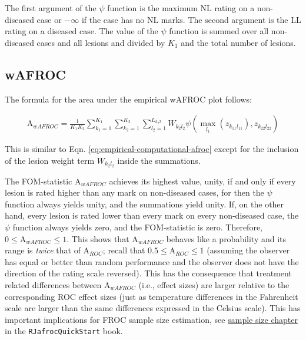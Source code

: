 \documentclass[
]{book}
\begin{document}
The first argument of the \(\psi\) function is the maximum NL rating on a non-diseased case or \(-\infty\) if the case has no NL marks. The second argument is the LL rating on a diseased case. The value of the \(\psi\) function is summed over all non-diseased cases and all lesions and divided by \(K_1\) and the total number of lesions.

\hypertarget{wafroc}{%
\subsection{wAFROC}\label{wafroc}}

The formula for the area under the empirical wAFROC plot follows:

\begin{equation}
\begin{aligned}
\text{A}_{wAFROC} = \frac{1}{K_1K_2}\sum_{k_1=1}^{K_1}\sum_{k_2=1}^{K_2}\sum_{l_2=1}^{L_{k_2 2}} W_{k_2l_2}\psi\left ( \max_{l_1}\left (z_{k_11l_11}  \right ),z_{k_22l_22} \right )
\end{aligned}
\label{eq:empirical-computational-wafroc}
\end{equation}

This is similar to Eqn. \eqref{eq:empirical-computational-afroc} except for the inclusion of the lesion weight term \(W_{k_2l_2}\) inside the summations.

The FOM-statistic \(\text{A}_{wAFROC}\) achieves its highest value, unity, if and only if every lesion is rated higher than any mark on non-diseased cases, for then the \(\psi\) function always yields unity, and the summations yield unity. If, on the other hand, every lesion is rated lower than every mark on every non-diseased case, the \(\psi\) function always yields zero, and the FOM-statistic is zero. Therefore, \(0 \leq \text{A}_{wAFROC} \leq 1\). This shows that \(\text{A}_{wAFROC}\) behaves like a probability and its range is \emph{twice} that of \(\text{A}_{ROC}\); recall that \(0.5 \leq \text{A}_{ROC} \leq 1\) (assuming the observer has equal or better than random performance and the observer does not have the direction of the rating scale reversed). This has the consequence that treatment related differences between \(\text{A}_{wAFROC}\) (i.e., effect sizes) are larger relative to the corresponding ROC effect sizes (just as temperature differences in the Fahrenheit scale are larger than the same differences expressed in the Celsius scale). This has important implications for FROC sample size estimation, see \href{https://dpc10ster.github.io/RJafrocQuickStart/froc-sample-size.html}{sample size chapter} in the \texttt{RJafrocQuickStart} book.
\end{document}
